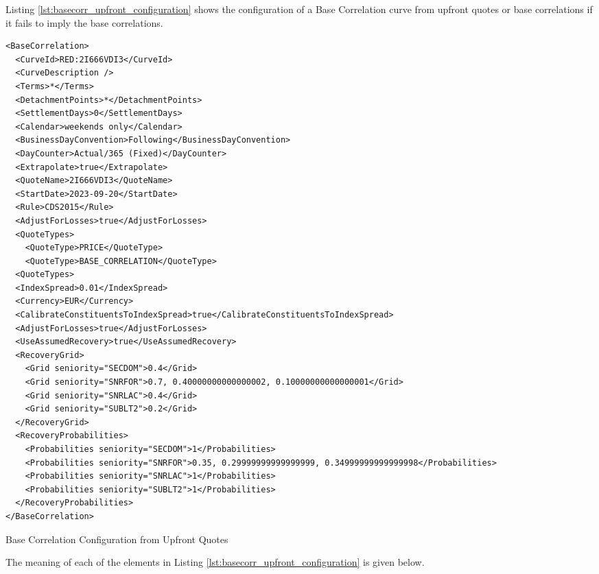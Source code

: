 Listing \ref{lst:basecorr_upfront_configuration} shows the configuration of a Base Correlation curve from upfront quotes or base correlations if it fails to imply the base correlations.

\begin{longlisting}
\begin{verbatim}
<BaseCorrelation>
  <CurveId>RED:2I666VDI3</CurveId>
  <CurveDescription />
  <Terms>*</Terms>
  <DetachmentPoints>*</DetachmentPoints>
  <SettlementDays>0</SettlementDays>
  <Calendar>weekends only</Calendar>
  <BusinessDayConvention>Following</BusinessDayConvention>
  <DayCounter>Actual/365 (Fixed)</DayCounter>
  <Extrapolate>true</Extrapolate>
  <QuoteName>2I666VDI3</QuoteName>
  <StartDate>2023-09-20</StartDate>
  <Rule>CDS2015</Rule>
  <AdjustForLosses>true</AdjustForLosses>
  <QuoteTypes>
    <QuoteType>PRICE</QuoteType>
    <QuoteType>BASE_CORRELATION</QuoteType>
  <QuoteTypes>
  <IndexSpread>0.01</IndexSpread>
  <Currency>EUR</Currency>
  <CalibrateConstituentsToIndexSpread>true</CalibrateConstituentsToIndexSpread>
  <AdjustForLosses>true</AdjustForLosses>
  <UseAssumedRecovery>true</UseAssumedRecovery>
  <RecoveryGrid>
    <Grid seniority="SECDOM">0.4</Grid>
    <Grid seniority="SNRFOR">0.7, 0.40000000000000002, 0.10000000000000001</Grid>
    <Grid seniority="SNRLAC">0.4</Grid>
    <Grid seniority="SUBLT2">0.2</Grid>
  </RecoveryGrid>
  <RecoveryProbabilities>
    <Probabilities seniority="SECDOM">1</Probabilities>
    <Probabilities seniority="SNRFOR">0.35, 0.29999999999999999, 0.34999999999999998</Probabilities>
    <Probabilities seniority="SNRLAC">1</Probabilities>
    <Probabilities seniority="SUBLT2">1</Probabilities>
  </RecoveryProbabilities>
</BaseCorrelation>
\end{verbatim}
\caption{Base Correlation Configuration from Upfront Quotes}
\label{lst:basecorr_upfront_configuration}
\end{longlisting}

The meaning of each of the elements in Listing \ref{lst:basecorr_upfront_configuration} is given below.

